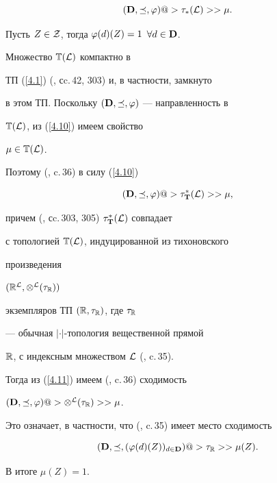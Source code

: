 {\begin{pf}
\begin{equation}\label{4.10}


({\bold D},\preceq,\vp) @>{{\tau}_*({\cal L})}>> \mu.


\end{equation}


Пусть $Z \in {\cal Z}$, тогда ${{\varphi}(d)}(Z) = 1$ \; $\forall{d} \in {\bold D}$.


Множество ${\Bbb T}({\cal L})$ компактно в


ТП (\ref{4.1}) (\cite{6}, сc.\,42, 303) и, в частности, замкнуто


в этом ТП. Поскольку $({\bold D},\preceq,\varphi)$ --- направленность в


${\Bbb T}({\cal L})$, из (\ref{4.10}) имеем свойство


$\mu \in {\Bbb T}({\cal L})$.


Поэтому (\cite{5}, c.\,36) в силу (\ref{4.10})


\begin{equation}\label{4.11}


({\bold D},\preceq,\vp) @>{{{\tau}_{\bold T}^*}({\cal L})}>> \mu,


\end{equation}


причем (\cite{6}, сc.\,303, 305) ${{\tau}_{\bold T}^*}({\cal L})$ совпадает


с топологией ${\Bbb T}({\cal L})$, индуцированной из тихоновского


произведения


$({{\Bbb R}^{\cal L}},{{\otimes}^{\cal L}}({\tau}_{\Bbb R}))$


экземпляров ТП $({\Bbb R},{{\tau}_{\Bbb R}})$, где ${\tau}_{\Bbb R}$


--- обычная $|\cdot|$-топология вещественной прямой


${\Bbb R}$, с индексным множеством ${\cal L}$ (\cite{6}, c.\,35).


Тогда из (\ref{4.11}) имеем (\cite{5}, c.\,36) сходимость


$({\bold D},\preceq,\varphi) @>{{{\otimes}^{\cal L}}({\tau}_{\Bbb R})}>> \mu$.


Это означает, в частности, что (\cite{6}, c.\,35) имеет место сходимость


$$


({\bold D},\preceq,({\vp}(d)(Z))_{d \in {\bold D}})


@>{{\tau}_{\Bbb R}}>> {\mu}(Z).


$$


В итоге ${\mu}(Z) = 1$.



\end{pf}}

